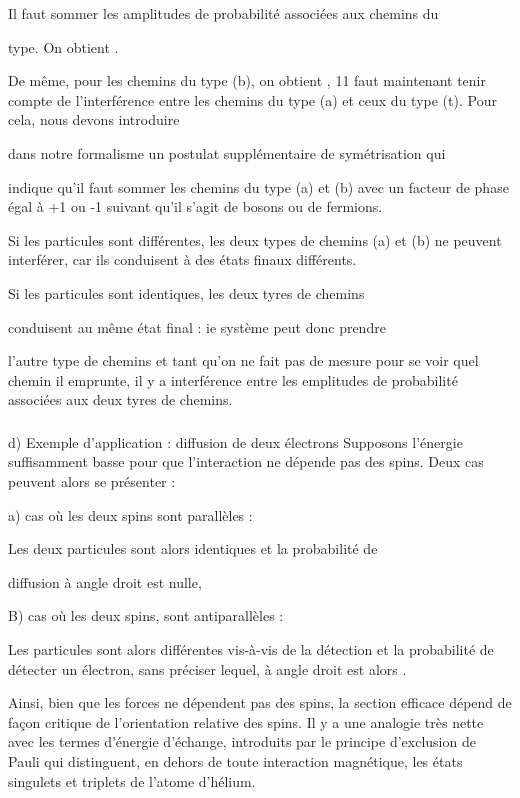 Il faut sommer les amplitudes de probabilité associées aux chemins du

type.  On obtient .


De même, pour les chemins du type (b), on obtient ,
11 faut maintenant tenir compte de l'interférence entre les chemins
du type (a) et ceux du type (t). Pour cela, nous devons introduire

dans notre formalisme un postulat supplémentaire de symétrisation qui

indique qu'il faut sommer les chemins du type (a) et (b) avec un facteur de
phase égal à +1 ou -1 suivant qu'il s'agit de bosons ou de
fermions.

Si les particules sont différentes, les deux types de chemins (a) et (b)
ne peuvent interférer, car ils conduisent à des états
finaux différents.

Si les particules sont identiques, les deux tyres de chemins

conduisent au même état final : ie système peut donc prendre

l'autre type de chemins et tant qu'on ne fait pas de mesure pour se
voir quel chemin il emprunte, il y a interférence entre les emplitudes
de probabilité associées aux deux tyres de chemins.
\subsubsection{}%
d) Exemple d'application : diffusion de deux électrons
Supposons l'énergie suffisamment basse pour que l'interaction ne
dépende pas des spins. Deux cas peuvent alors se présenter :

a) cas où les deux spins sont parallèles :

Les deux particules sont alors identiques et la probabilité de

diffusion à angle droit est nulle,


B) cas où les deux spins, sont antiparallèles :

Les particules sont alors différentes vis-à-vis de la
détection et la probabilité de détecter un électron, sans préciser
lequel, à angle droit est alors .

Ainsi, bien que les forces ne dépendent pas des spins, la section
efficace dépend de façon critique de l'orientation relative des
spins. Il y a une analogie très nette avec les termes d'énergie
d'échange, introduits par le principe d'exclusion de Pauli qui
distinguent, en dehors de toute interaction magnétique, les états
singulets et triplets de l'atome d'hélium.

